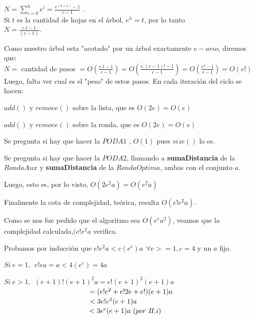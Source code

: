\documentclass[10pt, a4paper]{article}
\begin{document}
\hspace{60mm}$N = \sum\limits_{i=0}^h e ^i = \frac{e^{(h+1)} -1}{e-1} $ . \\


Si $t$ es la cantidad de hojas en el árbol, $e^{h} = t$, por lo tanto  \\


\hspace{60mm} $N = \frac{e.t -1}{(e-1)}$.

Como nuestro árbol esta "acotado" por un árbol exactamente  $e-ario$, diremos que:\\

\hspace{30mm}$N = $ cantidad de pasos $= O(\frac{e.t -1}{e-1}) = O(\frac{e.(e-1)! -1}{e-1}) = O(\frac{e! -1}{e-1}) = O(e!)$\\

Luego, falta ver cual es el "peso" de estos pasos. En cada iteración del ciclo se hacen:

$add()$ y $remove()$ sobre la lista, que es $O(2e) = O(e)$

$add()$ y $remove()$ sobre la ronda, que es $O(2e) = O(e)$

Se pregunta si hay que hacer la $PODA1$ , $O(1)$ pues $size()$ lo es.

Se pregunta si hay que hacer la $PODA2$, llamando a \textbf{sumaDistancia} de la $RondaAux$ y \textbf{sumaDistancia} de la $RondaOptima$, ambas con el conjunto $a$. 

Luego, esto es, por lo visto, $O(2e^{2}a) = O(e^{2}a)$

Finalmente la cota de complejidad, teórica, resulta $O(e!e^{2}a)$.

Como se nos fue pedido que el algoritmo sea $ O(e^{e}a^{2})$, veamos que la complejidad calculada,$(e!e^{2}a$ verifica.


Probamos por inducción que $e!e^{2}a < c(e^e)a \ \ \forall e >=1 , c = 4 $ y un $a$ fijo.

$Si \  e = 1,\ \  e!ea = a < 4(e^{e})=4a$

$Si \  e > 1, \ \  (e+1)!(e+1)^{2}a = e!(e+1)^{2}(e+1)a $\\

$\hspace{43mm} = (e!e^{2} + e!2e + e!)(e+1)a $\\

$\hspace{43mm} < 3e!e^{2}(e+1)a$\\

$\hspace{43mm}< 3e^{e}(e+1)a \ (por \  H.i) \ \\$
\end{document}
